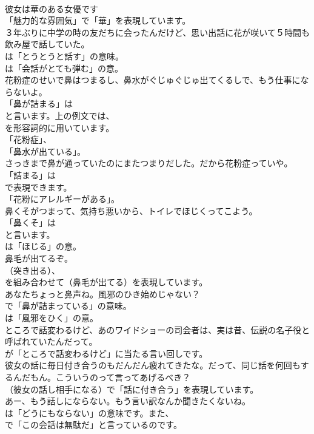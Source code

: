 \documentclass[8pt]{extreport}
\begin{document}
\begin{CJK}{UTF8}{min}
\\	彼女は華のある女優です 
\\	「魅力的な雰囲気」で「華」を表現しています。	
\\	３年ぶりに中学の時の友だちに会ったんだけど、思い出話に花が咲いて５時間も飲み屋で話していた。 
\\	は「とうとうと話す」の意味。
\\	は「会話がとても弾む」の意。	
\\	花粉症のせいで鼻はつまるし、鼻水がぐじゅぐじゅ出てくるしで、もう仕事にならないよ。 
\\	「鼻が詰まる」は
\\	と言います。上の例文では、
\\	を形容詞的に用いています。
\\	「花粉症」、
\\	「鼻水が出ている」。	
\\	さっきまで鼻が通っていたのにまたつまりだした。だから花粉症っていや。 
\\	「詰まる」は
\\	で表現できます。
\\	「花粉にアレルギーがある」。	
\\	鼻くそがつまって、気持ち悪いから、トイレでほじくってこよう。 
\\	「鼻くそ」は
\\	と言います。
\\	は「ほじる」の意。	
\\	鼻毛が出てるぞ。 
\\	（突き出る）、
\\	を組み合わせて（鼻毛が出てる）を表現しています。	
\\	あなたちょっと鼻声ね。風邪のひき始めじゃない？ 
\\	で「鼻が詰まっている」の意味。
\\	は「風邪をひく」の意。	
\\	ところで話変わるけど、あのワイドショーの司会者は、実は昔、伝説の名子役と呼ばれていたんだって。 
\\	が「ところで話変わるけど」に当たる言い回しです。	
\\	彼女の話に毎日付き合うのもだんだん疲れてきたな。だって、同じ話を何回もするんだもん。こういうのって言ってあげるべき？ 
\\	（彼女の話し相手になる）で「話に付き合う」を表現しています。	
\\	あー、もう話しにならない。もう言い訳なんか聞きたくないね。 
\\	は「どうにもならない」の意味です。また、
\\	で「この会話は無駄だ」と言っているのです。	

\end{CJK}
\end{document}
